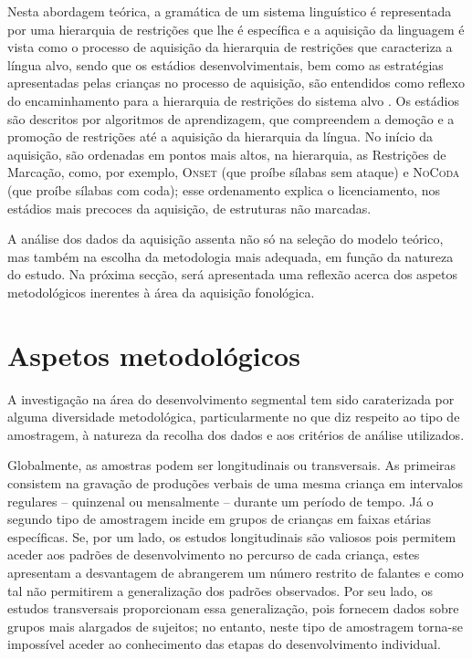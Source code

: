 \documentclass[output=paper]{LSP/langsci}
\begin{document}
Nesta abordagem teórica, a gramática de um sistema linguístico é representada por uma hierarquia de restrições que lhe é específica e a aquisição da linguagem é vista como o processo de aquisição da hierarquia de restrições que caracteriza a língua alvo, sendo que os estádios desenvolvimentais, bem como as estratégias apresentadas pelas crianças no processo de aquisição, são entendidos como reflexo do encaminhamento para a hierarquia de restrições do sistema alvo \citep{bernhardtstemberger1998}. Os estádios são descritos por algoritmos de aprendizagem, que compreendem a demoção e a promoção de restrições até a aquisição da hierarquia da língua. No início da aquisição, são ordenadas em pontos mais altos, na hierarquia, as Restrições de Marcação, como, por exemplo, \textsc{Onset} (que proíbe sílabas sem ataque) e \textsc{NoCoda} (que proíbe sílabas com coda); esse ordenamento explica o licenciamento, nos estádios mais precoces da aquisição, de estruturas não marcadas.

A análise dos dados da aquisição assenta não só na seleção do modelo teórico, mas também na escolha da metodologia mais adequada, em função da natureza do estudo. Na próxima secção, será apresentada uma reflexão acerca dos aspetos metodológicos inerentes à área da aquisição fonológica.

\section{Aspetos metodológicos}
\label{sec:matzenauer_metodologia}

A investigação na área do desenvolvimento segmental tem sido caraterizada por alguma diversidade metodológica, particularmente no que diz respeito ao tipo de amostragem, à natureza da recolha dos dados e aos critérios de análise utilizados.

Globalmente, as amostras podem ser longitudinais ou transversais. As primeiras consistem na gravação de produções verbais de uma mesma criança em intervalos regulares -- quinzenal ou mensalmente -- durante um período de tempo. Já o segundo tipo de amostragem incide em grupos de crianças em faixas etárias específicas. Se, por um lado, os estudos longitudinais são valiosos pois permitem aceder aos padrões de desenvolvimento no percurso de cada criança, estes apresentam a desvantagem de abrangerem um número restrito de falantes e como tal não permitirem a generalização dos padrões observados. Por seu lado, os estudos transversais proporcionam essa generalização, pois fornecem dados sobre grupos mais alargados de sujeitos; no entanto, neste tipo de amostragem torna-se impossível aceder ao conhecimento das etapas do desenvolvimento individual.
\end{document}
